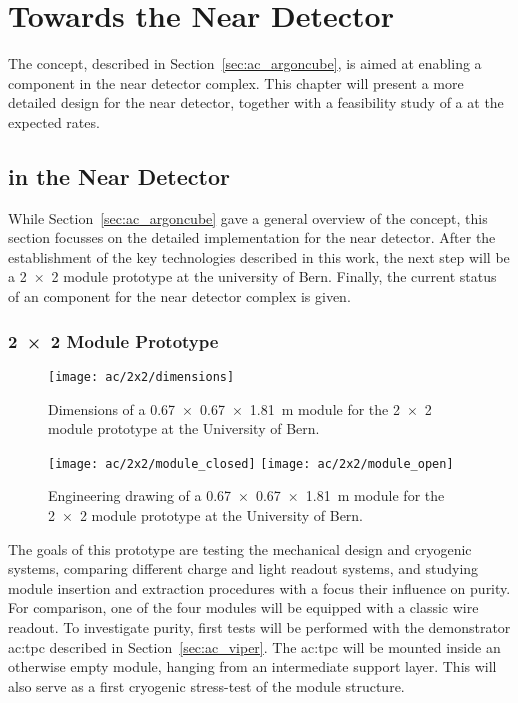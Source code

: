 \chapter{Towards the \dune{} Near Detector}
\label{chap:dune-nd}

The \AC{} concept, described in Section~\ref{sec:ac_argoncube}, is aimed at enabling a \lartpc{} component in the \dune{} near detector complex.
This chapter will present a more detailed design for the near detector, together with a feasibility study of a \lartpc{} at the expected rates.


\section{\AC{} in the \dune{} Near Detector}
\label{sec:dune-nd_ac}

While Section~\ref{sec:ac_argoncube} gave a general overview of the \AC{} concept, this section focusses on the detailed implementation for the \dune{} near detector.
After the establishment of the key technologies described in this work, the next step will be a \num{2 x 2} module prototype at the university of Bern.
Finally, the current status of an \AC{} \lartpc{} component for the \dune{} near detector complex is given.

\subsection{\num{2 x 2} Module Prototype}
\label{sec:dune-nd_ac_2x2}

\begin{figure}[htb]
	\centering
	\texttt{[image: ac/2x2/dimensions]}
	\caption{Dimensions of a \SI{0.67 x 0.67 x 1.81}{\metre} module for the \AC{} \num{2 x 2} module \AC{} prototype at the University of Bern.}
	\label{fig:2x2_dim}
\end{figure}

\begin{figure}[htb]
	\centering
	\texttt{[image: ac/2x2/module\_closed]}
	\texttt{[image: ac/2x2/module\_open]}
	\caption{Engineering drawing of a \SI{0.67 x 0.67 x 1.81}{\metre} module for the \AC{} \num{2 x 2} module \AC{} prototype at the University of Bern.}
	\label{fig:2x2_mod}
\end{figure}

The goals of this prototype are testing the mechanical design and cryogenic systems, comparing different charge and light readout systems, and studying module insertion and extraction procedures with a focus their influence on purity.
For comparison, one of the four modules will be equipped with a classic wire readout.
To investigate purity, first tests will be performed with the \AC{} demonstrator \gls{ac:tpc} described in Section~\ref{sec:ac_viper}.
The \gls{ac:tpc} will be mounted inside an otherwise empty module, hanging from an intermediate support layer.
This will also serve as a first cryogenic stress-test of the module structure.

